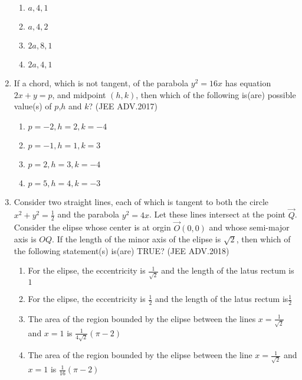 \documentclass[journal,12pt,onecolumn]{IEEEtran}
\theoremstyle{remark}
\begin{document}
\begin{enumerate}
	      \begin{enumerate}
		      \item $a,4,1$
		      \item $a,4,2$
		      \item $2a,8,1$
		      \item $2a,4,1$
	      \end{enumerate}
      \item If a chord, which is not tangent, of the parabola $y^2=16x$ has equation $2x+y=p$, and midpoint $(h,k)$, then which of the following is(are) possible value(s) of $p$,$h$ and $k$? 
	      \hfill(JEE ADV.2017)
	      
	      \begin{enumerate}
		      \item $p=-2,h=2,k=-4$
		      \item $p=-1,h=1,k=3$
		      \item $p=2,h=3,k=-4$
		      \item $p=5,h=4,k=-3$


	      \end{enumerate}
      \item Consider two straight lines, each of which is tangent to both the circle $x^2+y^2=\frac{1}{2}$
	      and the parabola $y^2=4x$. Let these lines intersect at the point $\vec{Q}$. Consider the elipse whose center is at orgin $\vec{O}(0,0)$ and whose semi-major axis is $OQ$.
	      If the length of the minor axis of the elipse is $\sqrt{2}$, then which of the following statement(s) is(are) TRUE? 
	      \hfill(JEE ADV.2018)
	      
	      \begin{enumerate}
		      \item For the elipse, the eccentricity is $\frac{1}{\sqrt{2}}$ and the length of the latus rectum is $1$

		      \item For the elipse, the eccentricity is $\frac{1}{2}$ and the length of the latus rectum is$\frac{1}{2}$
		      \item The area of the region bounded by the elipse between the lines $x=\frac{1}{\sqrt{2}}$ and $x=1$ is $\frac{1}{4\sqrt{2}}(\pi-2)$
		      \item The area of the region bounded by the elipse between the line $x=\frac{1}{\sqrt{2}}$ and $x=1$ is $\frac{1}{16}(\pi-2)$
	      \end{enumerate}

\end{enumerate}
\end{document}
